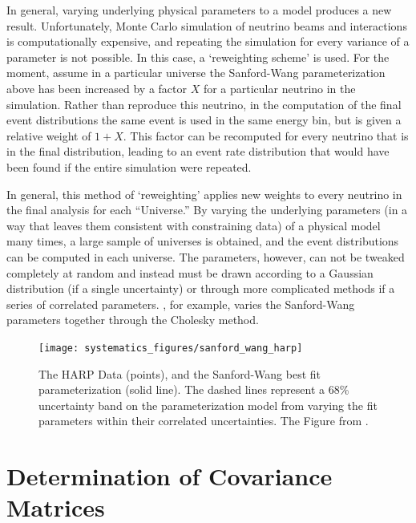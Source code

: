 In general, varying underlying physical parameters to a model produces a new result.  Unfortunately, Monte Carlo simulation of neutrino beams and interactions is computationally expensive, and repeating the simulation for every variance of a parameter is not possible.  In this case, a `reweighting scheme' is used.  For the moment, assume in a particular universe the Sanford-Wang parameterization above has been increased by a factor $X$ for a particular neutrino in the simulation.  Rather than reproduce this neutrino, in the computation of the final event distributions the same event is used in the same energy bin, but is given a relative weight of $1 + X$.  This factor can be recomputed for every neutrino that is in the final distribution, leading to an event rate distribution that would have been found if the entire simulation were repeated.

In general, this method of `reweighting' applies new weights to every neutrino in the final analysis for each ``Universe.''  By varying the underlying parameters (in a way that leaves them consistent with constraining data) of a physical model many times, a large sample of universes is obtained, and the event distributions can be computed in each universe.  The parameters, however, can not be tweaked completely at random and instead must be drawn according to a Gaussian distribution (if a single uncertainty) or through more complicated methods if a series of correlated parameters.  \MB, for example, varies the Sanford-Wang parameters together through the Cholesky method.


\begin{figure}[tb]
  \centering
  \texttt{[image: systematics\_figures/sanford\_wang\_harp]}
  \caption[HARP Data and Sanford-Wang Fit]{The HARP Data (points), and the Sanford-Wang best fit parameterization (solid line).  The dashed lines represent a 68\% uncertainty band on the parameterization model from varying the fit parameters within their correlated uncertainties.  The Figure from \cite{AguilarArevalo:2008yp}.}
  \label{fig:sanford_wang_harp}
\end{figure}

\section{Determination of Covariance Matrices}
\label{sec:covariance_matrix}

